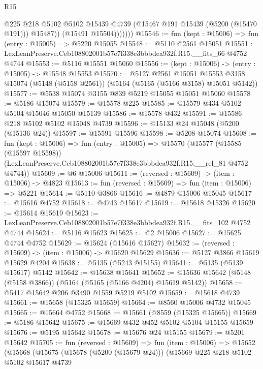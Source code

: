 \begin{lexlean}{R15}
\begin{coremodule}
{{{{{{{{{{{                    @225
                    @218
                    @5102
                    @5102
                    @15439
                    @4739
                    (@15467 @191 @15439 (@5200 (@15470 @191)))
                    @15487))
                (@15491 @15504)))))))
@15546 := fun (kept : @15006) => fun (entry : @15005) => @5220 @15055
@15548 := @5110 @2561 @15051
@15551 := LexLeanPreserve.Ceb108802001b57e7f338e3bbbdea932f.R15.__fits_66 @4752 @4744
@15553 := @5116 @15551 @15060
@15556 := (kept : @15006) -> (entry : @15005) -> @15548 @15553
@15570 := @5127
    @2561
    @15051
    @15553
    @3158
    @15074
    (@5148 (@5158 @2561))
    (@5164 (@5165 (@5166 @3158) @15051 @5142))
@15577 := @5538 @15074 @3155 @839 @5219 @15055 @15051 @15060
@15578 := @5186 @15074
@15579 := @15578 @225
@15585 := @15579 @434 @5102 @5104 @15046 @15050 @15139
@15586 := @15578 @432
@15591 := @15586 @218 @5102 @5102 @15048 @4739
@15596 := @15133 @24 @15048 (@5200 (@15136 @24))
@15597 := @15591 @15596
@15598 := @5208 @15074
@15608 := fun (kept : @15006) =>
  fun (entry : @15005) =>
  @15570
    (@15577
      (@15585 (@15597 @15598))
      (LexLeanPreserve.Ceb108802001b57e7f338e3bbbdea932f.R15.__rel_81 @4752 @4744))
@15609 := @6 @15006
@15611 := (reversed : @15609) -> (item : @15006) -> @4823
@15613 := fun (reversed : @15609) => fun (item : @15006) => @5221
@15614 := @5110 @3866
@15616 := @4879 @15006 @15045
@15617 := @15616 @4752
@15618 := @4743 @15617
@15619 := @15618 @15326
@15620 := @15614 @15619
@15623 := LexLeanPreserve.Ceb108802001b57e7f338e3bbbdea932f.R15.__fits_102 @4752 @4744
@15624 := @5116 @15623
@15625 := @2 @15006
@15627 := @15625 @4744 @4752
@15629 := @15624 (@15616 @15627)
@15632 := (reversed : @15609) -> (item : @15006) -> @15620 @15629
@15636 := @5127 @3866 @15619 @15629 @4204
@15638 := @5135 (@5243 @15155)
@15641 := @5135 (@5139 @15617) @5142
@15642 := @15638 @15641
@15652 := @15636 @15642 (@5148 (@5158 @3866)) (@5164 (@5165 (@5166 @4204) @15619 @5142))
@15658 := @5417 @15642 @206 @3490 @1559 @5219 @5102
@15659 := @15618 @4739
@15661 := @15658 (@15325 @15659)
@15664 := @8560 @15006 @4732 @15045
@15665 := @15664 @4752
@15668 := @15661 (@8559 (@15325 @15665))
@15669 := @5186 @15642
@15675 := @15669 @432 @452 @5102 @5104 @15155 @15659
@15676 := @5195 @15642
@15678 := @15676 @24 @15155
@15679 := @5201 @15642
@15705 := fun (reversed : @15609) =>
  fun (item : @15006) =>
  @15652
    (@15668
      (@15675
        (@15678 (@5200 (@15679 @24)))
        (@15669
          @225
          @218
          @5102
          @5102
          @15617
          @4739
}}}}}}}}}}}
\end{coremodule}
\end{lexlean}
